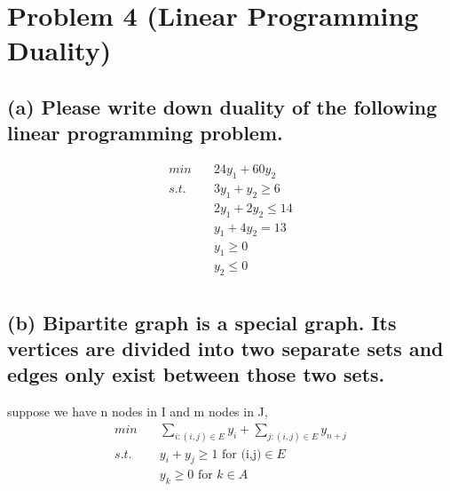 \documentclass[a4paper,12pt]{journal}
\begin{document}
	\section*{Problem 4 (Linear Programming Duality)}
	\subsection*{(a) Please write down duality of the following linear programming problem.}
	\begin{equation}
		\begin{aligned}
			min\quad&24y_1+60y_2\\
			s.t.\quad&3y_1+y_2\geq 6\\
			&2y_1+2y_2\leq 14\\
			&y_1+4y_2= 13\\
			&y_1\geq 0\\
			&y_2\leq 0\\
		\end{aligned}
	\end{equation}
	\subsection*{(b) Bipartite graph is a special graph. Its vertices are divided into two separate sets and edges only exist between those two sets.}
	suppose we have n nodes in I and m nodes in J, 
	\begin{equation}
		\begin{aligned}
			min\quad &\sum_{i:(i,j)\in E}y_i+\sum_{j:(i,j)\in E}y_{n+j}\\
			s.t.\quad &y_i+y_j\geq 1\text{ for (i,j)}\in E\\
			&y_k\geq 0\text{ for }k\in A
		\end{aligned}
	\end{equation}
\end{document}
